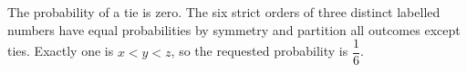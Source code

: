 The probability of a tie is zero. The six strict orders of three distinct labelled numbers have equal probabilities by symmetry and partition all outcomes except ties. Exactly one is $x<y<z$, so the requested probability is $\boxed{\dfrac{1}{6}}$.
